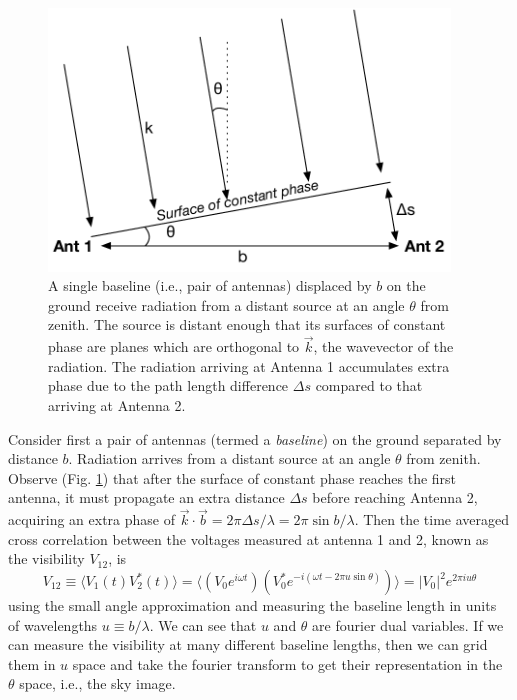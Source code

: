 \begin{figure}[h]
    \centering
    \includegraphics[width=0.95\textwidth]{chap0_intro/radio_interferometer_diagram.pdf}
    \caption[Diagram of a two element radio interferometer]{A single baseline (i.e., pair of antennas) displaced by $b$ on the ground receive radiation from a distant source at an angle $\theta$ from zenith. The source is distant enough that its surfaces of constant phase are planes which are orthogonal to $\vec{k}$, the wavevector of the radiation. The radiation arriving at Antenna 1 accumulates extra phase due to the path length difference $\Delta s$ compared to that arriving at Antenna 2.}
    \label{fig:radiointerferometerdiagram}
\end{figure}

Consider first a pair of antennas (termed a \textit{baseline}) on the ground separated by distance $b$. Radiation arrives from a distant source at an angle $\theta$ from zenith. Observe (Fig. \ref{fig:radiointerferometerdiagram}) that after the surface of constant phase reaches the first antenna, it must propagate an extra distance $\Delta s$ before reaching Antenna 2, acquiring an extra phase of $\vec{k}\cdot \vec{b}=2\pi\Delta s/\lambda=2\pi\sin b/\lambda$. Then the time averaged cross correlation between the voltages measured at antenna 1 and 2, known as the visibility $V_{12}$, is
\begin{equation}
\label{eqn:vis1D}
	V_{12}\equiv\langle V_1(t)V_2^*(t)\rangle=\langle(V_0 e^{i\omega t})(V_0^*e^{-i(\omega t-2\pi u\sin \theta)})\rangle = |V_0|^2 e^{2\pi i u\theta}
\end{equation}
using the small angle approximation and measuring the baseline length in units of wavelengths $u\equiv b/\lambda$. We can see that $u$ and $\theta$ are fourier dual variables. If we can measure the visibility at many different baseline lengths, then we can grid them in $u$ space and take the fourier transform to get their representation in the $\theta$ space, i.e., the sky image.

